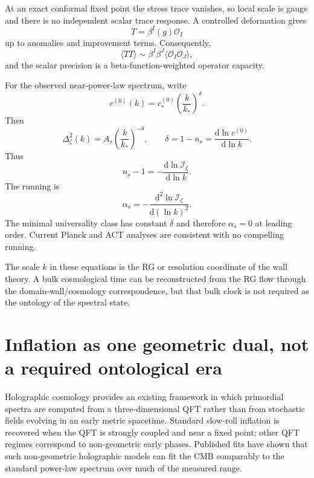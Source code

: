 \documentclass[11pt]{article}
\numberwithin{equation}{section}
\newcommand{\dd}{\mathrm d}
\newcommand{\Iz}{\mathcal I_\zeta}
\newcommand{\cz}{c^{(0)}}
\begin{document}
At an exact conformal fixed point the stress trace vanishes, so local scale is gauge and there is no independent scalar trace response. A controlled deformation gives
\begin{equation}
\boxed{T=\beta^I(g)\mathcal O_I}
\end{equation}
up to anomalies and improvement terms. Consequently,
\begin{equation}
\langle TT\rangle\sim\beta^I\beta^J\langle\mathcal O_I\mathcal O_J\rangle,
\end{equation}
and the scalar precision is a beta-function-weighted operator capacity.

For the observed near-power-law spectrum, write
\begin{equation}
\cz(k)=\cz_*\left(\frac{k}{k_*}\right)^\delta.
\end{equation}
Then
\begin{equation}
\boxed{
\Delta_\zeta^2(k)=A_s\left(\frac{k}{k_*}\right)^{-\delta},
\qquad
\delta=1-n_s=\frac{\dd\ln\cz}{\dd\ln k}.}
\end{equation}
Thus
\begin{equation}
\boxed{n_s-1=-\frac{\dd\ln\Iz}{\dd\ln k}.}
\end{equation}
The running is
\begin{equation}
\boxed{\alpha_s=-\frac{\dd^2\ln\Iz}{\dd(\ln k)^2}.}
\end{equation}
The minimal universality class has constant $\delta$ and therefore $\alpha_s=0$ at leading order. Current Planck and ACT analyses are consistent with no compelling running.

The scale $k$ in these equations is the RG or resolution coordinate of the wall theory. A bulk cosmological time can be reconstructed from the RG flow through the domain-wall/cosmology correspondence, but that bulk clock is not required as the ontology of the spectral state.

\section{Inflation as one geometric dual, not a required ontological era}

Holographic cosmology provides an existing framework in which primordial spectra are computed from a three-dimensional QFT rather than from stochastic fields evolving in an early metric spacetime. Standard slow-roll inflation is recovered when the QFT is strongly coupled and near a fixed point; other QFT regimes correspond to non-geometric early phases. Published fits have shown that such non-geometric holographic models can fit the CMB comparably to the standard power-law spectrum over much of the measured range.
\end{document}

